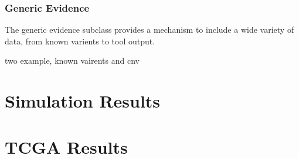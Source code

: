\documentclass[11pt]{article}
\begin{document}


\subsubsection{Generic Evidence}

The generic evidence subclass provides a mechanism to include a wide variety of
data, from known varients to tool output.

two example, known vairents and cnv


\section{Simulation Results}
\section{TCGA Results}



\end{document}
